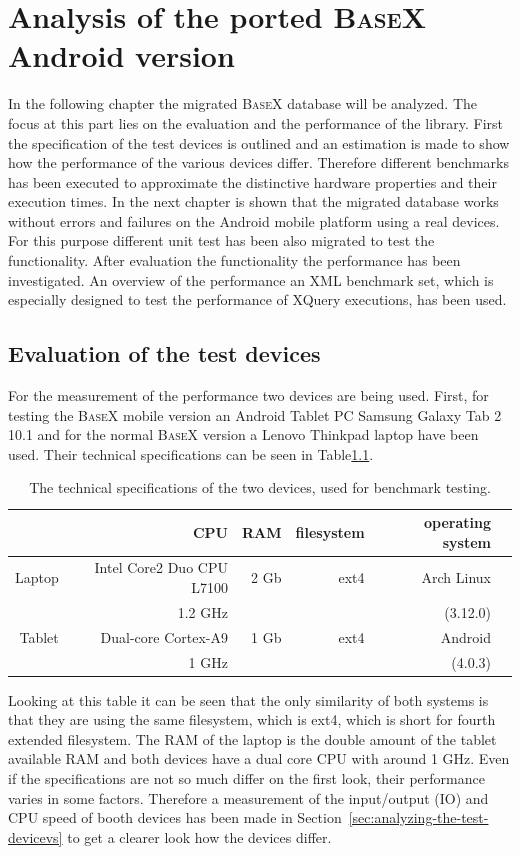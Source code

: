 \chapter{Analysis of the ported \textsc{BaseX} Android version}
\label{cha:analysis}
In the following chapter the migrated \textsc{BaseX} database will be analyzed.
The focus at this part lies on the evaluation and the performance of the library.
First the specification of the test devices is outlined and an estimation is made to show how the performance of the various devices differ.
Therefore different benchmarks has been executed to approximate the distinctive hardware properties and their execution times.
In the next chapter is shown that the migrated database works without errors and failures on the Android mobile platform using a real devices.
For this purpose different unit test has been also migrated to test the functionality.
After evaluation the functionality the performance has been investigated.
An overview of the performance an XML benchmark set, which is especially designed to test the performance of XQuery executions, has been used.
\section{Evaluation of the test devices}
\label{sec:evaluation-of-the-test-devices}
For the measurement of the performance two devices are being used.
First, for testing the \textsc{BaseX} mobile version an Android Tablet PC Samsung Galaxy Tab 2 10.1 and for the normal \textsc{BaseX} version a Lenovo Thinkpad laptop have been used.
Their technical specifications can be seen in Table\ref{tab:test-dev-specs}.
\begin {table}[htpb] 
  \centering
\begin {tabular} {|r|r|r|r|r|r|}
  	\hline
	&CPU&RAM&filesystem&operating system\\
	\hline
	Laptop&Intel Core2 Duo CPU L7100&2 Gb&ext4&Arch Linux\\
	&1.2 GHz&&&(3.12.0)\\
	\hline
	Tablet&Dual-core Cortex-A9&1 Gb&ext4&Android\\
	&1 GHz&&&(4.0.3)\\
	\hline
\end {tabular}
\caption {The technical specifications of the two devices, used for benchmark testing.}
\label {tab:test-dev-specs}
\end {table}

Looking at this table it can be seen that the only similarity of both systems is that they are using the same filesystem, which is ext4, which is short for fourth extended filesystem.
The RAM of the laptop is the double amount of the tablet available RAM and both devices have a dual core CPU with around 1 GHz.
Even if the specifications are not so much differ on the first look, their performance varies in some factors.
Therefore a measurement of the input/output (IO) and CPU speed of booth devices has been made in Section~\ref{sec:analyzing-the-test-devicevs} to get a clearer look how the devices differ.


